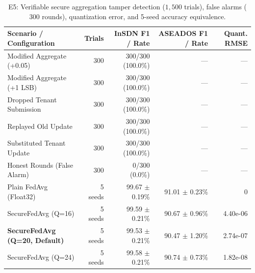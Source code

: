 \begin{table}[t]
\centering
\caption{E5: Verifiable secure aggregation tamper detection ($1,500$ trials), false alarms ($300$ rounds), quantization error, and 5-seed accuracy equivalence.}
\label{tab:e5_verifiable}
\begin{tabular}{lrrrr}
\toprule
Scenario / Configuration & Trials & InSDN F1 / Rate & ASEADOS F1 / Rate & Quant. RMSE \\
\midrule
Modified Aggregate (+0.05) & 300 & 300/300 (100.0\%) & --- & --- \\
Modified Aggregate (+1 LSB) & 300 & 300/300 (100.0\%) & --- & --- \\
Dropped Tenant Submission & 300 & 300/300 (100.0\%) & --- & --- \\
Replayed Old Update & 300 & 300/300 (100.0\%) & --- & --- \\
Substituted Tenant Update & 300 & 300/300 (100.0\%) & --- & --- \\
Honest Rounds (False Alarm) & 300 & 0/300 (0.0\%) & --- & --- \\
\midrule
Plain FedAvg (Float32) & 5 seeds & 99.67 $\pm$ 0.19\% & 91.01 $\pm$ 0.23\% & 0 \\
SecureFedAvg (Q=16) & 5 seeds & 99.59 $\pm$ 0.21\% & 90.67 $\pm$ 0.96\% & 4.40e-06 \\
\textbf{SecureFedAvg (Q=20, Default)} & 5 seeds & 99.53 $\pm$ 0.21\% & 90.47 $\pm$ 1.20\% & 2.74e-07 \\
SecureFedAvg (Q=24) & 5 seeds & 99.58 $\pm$ 0.21\% & 90.74 $\pm$ 0.73\% & 1.82e-08 \\
\bottomrule
\end{tabular}
\end{table}
